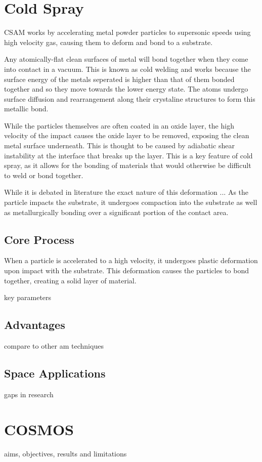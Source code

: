 \section{Cold Spray}
CSAM works by accelerating metal powder particles to supersonic speeds using high velocity gas, causing them to deform and bond to a substrate. 

Any atomically-flat clean surfaces of metal will bond together when they come into contact in a vacuum\cite{holzbauer2024}. This is known as cold welding and works because the surface energy of the metals seperated is higher than that of them bonded together and so they move towards the lower energy state. The atoms undergo surface diffusion and rearrangement along their crystaline structures\cite{ctx46070057700001591} to form this metallic bond. 

While the particles themselves are often coated in an oxide layer, the high velocity of the impact causes the oxide layer to be removed, exposing the clean metal surface underneath. This is thought to be caused by adiabatic shear instability at the interface that breaks up the layer\cite{assadi2016cold}. This is a key feature of cold spray, as it allows for the bonding of materials that would otherwise be difficult to weld or bond together.


While it is debated in literature the exact nature of this deformation ...
As the particle impacts the substrate, it undergoes compaction into the substrate as well as metallurgically bonding over a significant portion of the contact area.
\subsection{Core Process}
When a particle is accelerated to a high velocity, it undergoes plastic deformation upon impact with the substrate. This deformation causes the particles to bond together, creating a solid layer of material. 

key parameters
\subsection{Advantages}
compare to other am techniques
\subsection{Space Applications}

gaps in research

\section{COSMOS}
aims, objectives, results and limitations